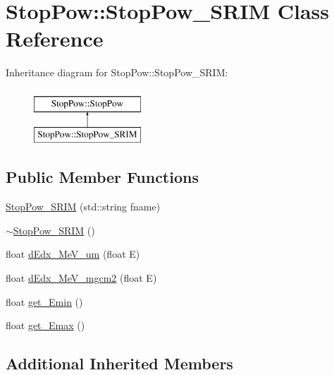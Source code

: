 \hypertarget{class_stop_pow_1_1_stop_pow___s_r_i_m}{\section{Stop\-Pow\-:\-:Stop\-Pow\-\_\-\-S\-R\-I\-M Class Reference}
\label{class_stop_pow_1_1_stop_pow___s_r_i_m}
}
Inheritance diagram for Stop\-Pow\-:\-:Stop\-Pow\-\_\-\-S\-R\-I\-M\-:\begin{figure}[H]
\begin{center}
\leavevmode
\includegraphics[height=2.000000cm]{class_stop_pow_1_1_stop_pow___s_r_i_m}
\end{center}
\end{figure}
\subsection*{Public Member Functions}
\begin{DoxyCompactItemize}
\item 
\hyperlink{class_stop_pow_1_1_stop_pow___s_r_i_m_aa94b3135a266b128cef16b1f42fca53b}{Stop\-Pow\-\_\-\-S\-R\-I\-M} (std\-::string fname)
\item 
\hyperlink{class_stop_pow_1_1_stop_pow___s_r_i_m_ae4e2b3573df4cac0732b30dbd833fa71}{$\sim$\-Stop\-Pow\-\_\-\-S\-R\-I\-M} ()
\item 
float \hyperlink{class_stop_pow_1_1_stop_pow___s_r_i_m_aaf36060614c8e268d2a4a4db4b77a44d}{d\-Edx\-\_\-\-Me\-V\-\_\-um} (float E)
\item 
float \hyperlink{class_stop_pow_1_1_stop_pow___s_r_i_m_a303d20db094642491b861a07f05c48b6}{d\-Edx\-\_\-\-Me\-V\-\_\-mgcm2} (float E)
\item 
float \hyperlink{class_stop_pow_1_1_stop_pow___s_r_i_m_aedd811155859225354c8d64431f02c4f}{get\-\_\-\-Emin} ()
\item 
float \hyperlink{class_stop_pow_1_1_stop_pow___s_r_i_m_a98bb557b88bf5a9d09cd3d718da36c1f}{get\-\_\-\-Emax} ()
\end{DoxyCompactItemize}
\subsection*{Additional Inherited Members}



